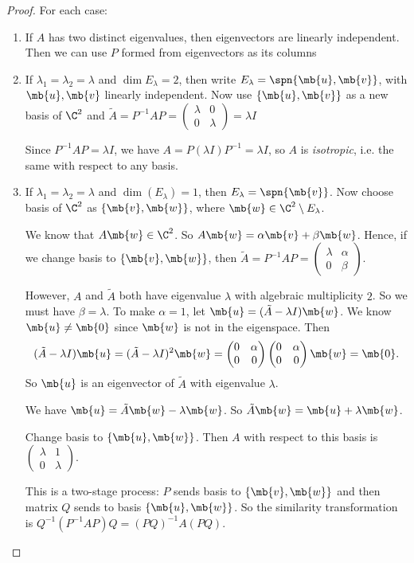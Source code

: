 \documentclass[a4paper]{article}
\begin{document}
\begin{proof}
  For each case:
  \begin{enumerate}
  \item If $A$ has two distinct eigenvalues, then eigenvectors are linearly independent. Then we can use $P$ formed from eigenvectors as its columns
  \item If $\lambda_1=\lambda_2 = \lambda$ and $\dim E_\lambda = 2$, then write $E_\lambda = \spn\{\mb{u}, \mb{v}\}$, with $\mb{u}, \mb{v}$ linearly independent. Now use $\{\mb{u}, \mb{v}\}$  as a new basis of $\C^2$ and $\tilde{A} = P^{-1}AP = 
    \begin{pmatrix}
      \lambda & 0\\
      0 & \lambda
    \end{pmatrix} = \lambda I$

    \note Since $P^{-1}AP = \lambda I$, we have $A = P(\lambda I)P^{-1} = \lambda I$, so $A$ is \emph{isotropic}, i.e. the same with respect to any basis.
  \item If $\lambda_1 = \lambda_2 = \lambda$ and $\dim (E_\lambda) = 1$, then $E_\lambda = \spn\{\mb{v}\}$. Now choose basis of $\C^2$ as $\{\mb{v}, \mb{w}\}$, where $\mb{w}\in \C^2\setminus E_\lambda$.

    We know that $A\mb{w}\in \C^2$. So $A\mb{w} = \alpha \mb{v} + \beta \mb{w}$. Hence, if we change basis to $\{\mb{v}, \mb{w}\}$, then $\tilde{A} = P^{-1}AP = 
    \begin{pmatrix}
      \lambda & \alpha\\
      0 & \beta
    \end{pmatrix}$.

    However, $A$ and $\tilde{A}$ both have eigenvalue $\lambda$ with algebraic multiplicity $2$. So we must have $\beta = \lambda$. To make $\alpha = 1$, let $\mb{u} = (\tilde{A} - \lambda I)\mb{w}$. We know $\mb{u}\not= \mb{0}$ since $\mb{w}$ is not in the eigenspace. Then 
    \[
    (\tilde{A} - \lambda I)\mb{u} = (\tilde{A} - \lambda I)^2 \mb{w} = 
    \begin{pmatrix}
      0 & \alpha\\
      0 & 0
    \end{pmatrix}
    \begin{pmatrix}
      0 & \alpha\\
      0 & 0
    \end{pmatrix}\mb{w} = \mb{0}.
    \]
    So $\mb{u}$ is an eigenvector of $\tilde{A}$ with eigenvalue $\lambda$.

    We have $\mb{u} = \tilde A\mb{w} - \lambda\mb{w}$. So $\tilde A\mb{w} = \mb{u} + \lambda\mb{w}$. 

    Change basis to $\{\mb{u}, \mb{w}\}$. Then $A$ with respect to this basis is $
    \begin{pmatrix}
      \lambda & 1\\
      0 & \lambda
    \end{pmatrix}$.

    This is a two-stage process: $P$ sends basis to $\{\mb{v}, \mb{w}\}$ and then matrix $Q$ sends to basis $\{\mb{u}, \mb{w}\}$. So the similarity transformation is $Q^{-1}(P^{-1}AP)Q = (PQ)^{-1}A(PQ)$.
  \end{enumerate}
\end{proof}
\end{document}
